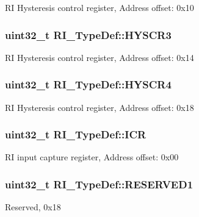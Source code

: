 R\-I Hysteresis control register, Address offset\-: 0x10 \hypertarget{struct_r_i___type_def_a0dd74384be92e97899cb4d7477962d50}{
\subsubsection[{H\-Y\-S\-C\-R3}]{ uint32\-\_\-t R\-I\-\_\-\-Type\-Def\-::\-H\-Y\-S\-C\-R3}}\label{struct_r_i___type_def_a0dd74384be92e97899cb4d7477962d50}
R\-I Hysteresis control register, Address offset\-: 0x14 \hypertarget{struct_r_i___type_def_ad54de1fa4e48c8bd79e0afcfeb2bac27}{
\subsubsection[{H\-Y\-S\-C\-R4}]{ uint32\-\_\-t R\-I\-\_\-\-Type\-Def\-::\-H\-Y\-S\-C\-R4}}\label{struct_r_i___type_def_ad54de1fa4e48c8bd79e0afcfeb2bac27}
R\-I Hysteresis control register, Address offset\-: 0x18 \hypertarget{struct_r_i___type_def_adb5a93377d850e81160dc037c5995029}{
\subsubsection[{I\-C\-R}]{ uint32\-\_\-t R\-I\-\_\-\-Type\-Def\-::\-I\-C\-R}}\label{struct_r_i___type_def_adb5a93377d850e81160dc037c5995029}
R\-I input capture register, Address offset\-: 0x00 \hypertarget{struct_r_i___type_def_a1335591e16918824ef985bfd525084ad}{
\subsubsection[{R\-E\-S\-E\-R\-V\-E\-D1}]{\setlength{\rightskip}{0pt plus 5cm}uint32\-\_\-t R\-I\-\_\-\-Type\-Def\-::\-R\-E\-S\-E\-R\-V\-E\-D1}}\label{struct_r_i___type_def_a1335591e16918824ef985bfd525084ad}
Reserved, 0x18 

